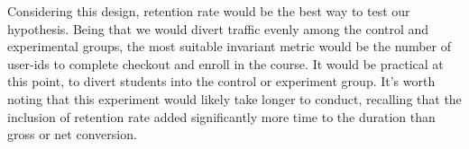 \documentclass[paper=a4, fontsize=11pt]{scrartcl} %
\numberwithin{equation}{section} %
\numberwithin{figure}{section} %
\numberwithin{table}{section} %
\begin{document}
Considering this design, retention rate would be the best way to test our hypothesis.  Being that we would divert traffic evenly among the control and experimental groups, the most suitable invariant metric would be the number of user-id\textquotesingle s to complete checkout and enroll in the course.  It would be practical at this point, to divert students into the control or experiment group.  It's worth noting that this experiment would likely take longer to conduct, recalling that the inclusion of retention rate added significantly more time to the duration than gross or net conversion.
\end{document}
